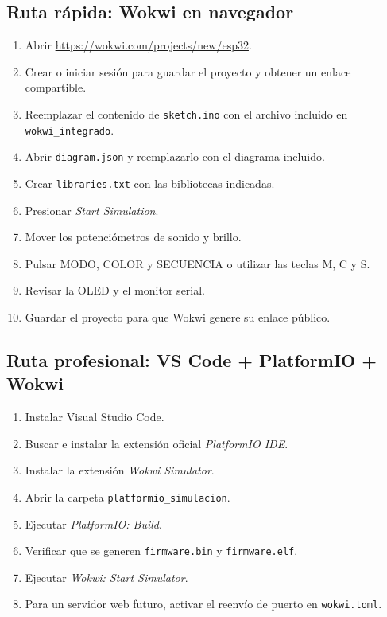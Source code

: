 \documentclass[11pt,a4paper]{article}
\begin{document}
\subsection{Ruta rápida: Wokwi en navegador}
\begin{enumerate}
  \item Abrir \url{https://wokwi.com/projects/new/esp32}.
  \item Crear o iniciar sesión para guardar el proyecto y obtener un enlace compartible.
  \item Reemplazar el contenido de \texttt{sketch.ino} con el archivo incluido en \texttt{wokwi\_integrado}.
  \item Abrir \texttt{diagram.json} y reemplazarlo con el diagrama incluido.
  \item Crear \texttt{libraries.txt} con las bibliotecas indicadas.
  \item Presionar \textit{Start Simulation}.
  \item Mover los potenciómetros de sonido y brillo.
  \item Pulsar MODO, COLOR y SECUENCIA o utilizar las teclas M, C y S.
  \item Revisar la OLED y el monitor serial.
  \item Guardar el proyecto para que Wokwi genere su enlace público.
\end{enumerate}

\subsection{Ruta profesional: VS Code + PlatformIO + Wokwi}
\begin{enumerate}
  \item Instalar Visual Studio Code.
  \item Buscar e instalar la extensión oficial \textit{PlatformIO IDE}.
  \item Instalar la extensión \textit{Wokwi Simulator}.
  \item Abrir la carpeta \texttt{platformio\_simulacion}.
  \item Ejecutar \textit{PlatformIO: Build}.
  \item Verificar que se generen \texttt{firmware.bin} y \texttt{firmware.elf}.
  \item Ejecutar \textit{Wokwi: Start Simulator}.
  \item Para un servidor web futuro, activar el reenvío de puerto en \texttt{wokwi.toml}. \cite{wokwi-config}
\end{enumerate}
\end{document}

